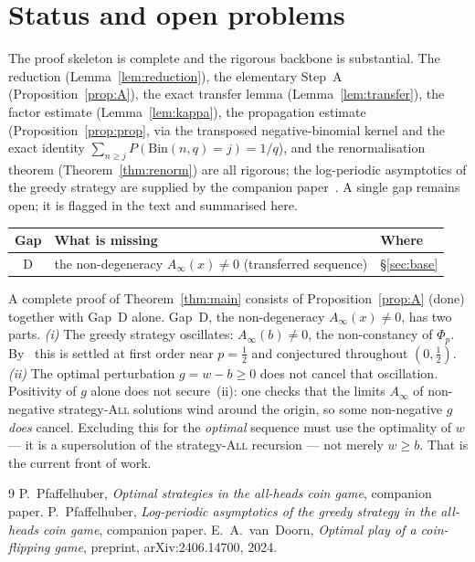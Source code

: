 \documentclass[11pt]{article}
\theoremstyle{definition}
\newcommand{\All}{\textsc{All}}
\begin{document}
\section{Status and open problems}\label{sec:status}

The proof skeleton is complete and the rigorous backbone is
substantial. The reduction (Lemma~\ref{lem:reduction}), the elementary
Step~A (Proposition~\ref{prop:A}), the exact transfer lemma
(Lemma~\ref{lem:transfer}), the factor estimate
(Lemma~\ref{lem:kappa}), the propagation estimate
(Proposition~\ref{prop:prop}, via the transposed negative-binomial
kernel and the exact identity $\sum_{n\ge j}P(\mathrm{Bin}(n,q)=j)
=1/q$), and the renormalisation theorem (Theorem~\ref{thm:renorm})
are all rigorous; the log-periodic asymptotics of the greedy strategy
are supplied by the companion paper~\cite{Paper2}. A single gap
remains open; it is flagged in the text and summarised here.

\begin{center}
\renewcommand{\arraystretch}{1.3}
\begin{tabular}{@{}cll@{}}
\hline
\textbf{Gap} & \textbf{What is missing} & \textbf{Where} \\
\hline
D & the non-degeneracy $A_\infty(x)\ne0$ (transferred sequence)
  & \S\ref{sec:base} \\
\hline
\end{tabular}
\end{center}

\noindent A complete proof of Theorem~\ref{thm:main} consists of
Proposition~\ref{prop:A} (done) together with Gap~D alone. Gap~D, the
non-degeneracy $A_\infty(x)\ne0$, has two parts. \emph{(i)} The greedy
strategy oscillates: $A_\infty(b)\ne0$, the non-constancy of $\Phi_p$.
By~\cite{Paper2} this is settled at first order near $p=\tfrac12$ and
conjectured throughout $(0,\tfrac12)$. \emph{(ii)} The optimal
perturbation $g=w-b\ge0$ does not cancel that oscillation. Positivity
of $g$ alone does not secure~(ii): one checks that the limits
$A_\infty$ of non-negative strategy-\All{} solutions wind around the
origin, so some non-negative $g$ \emph{does} cancel. Excluding this
for the \emph{optimal} sequence must use the optimality of $w$ --- it
is a supersolution of the strategy-\All{} recursion --- not merely
$w\ge b$. That is the current front of work.

\begin{thebibliography}{9}
  P.~Pfaffelhuber,
  \emph{Optimal strategies in the all-heads coin game},
  companion paper.
  P.~Pfaffelhuber,
  \emph{Log-periodic asymptotics of the greedy strategy in the
  all-heads coin game},
  companion paper.
  E.~A.~van~Doorn,
  \emph{Optimal play of a coin-flipping game},
  preprint, arXiv:2406.14700, 2024.
\end{thebibliography}
\end{document}
